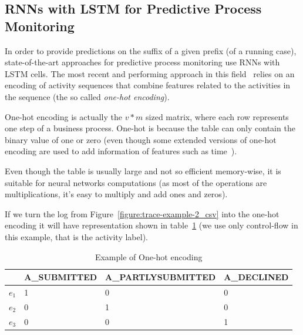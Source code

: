 \subsection{RNNs with LSTM for Predictive Process Monitoring}
\label{subsec:RNNforpredictive}
In order to provide predictions on the suffix of a given prefix (of a running case), state-of-the-art approaches for predictive process monitoring use RNNs with LSTM cells.  The most recent and performing approach in this field~\cite{niek96732} relies on an encoding of activity sequences that combine features related to the activities in the sequence (the so called \textit{one-hot encoding}).

One-hot encoding is actually the $v*m$ sized matrix, where each row represents one step of a business process. One-hot is because the table can only contain the binary value of one or zero (even though some extended versions of one-hot encoding are used to add information of features such as time~\cite{niek96732}). 

Even though the table is usually large and not so efficient memory-wise, it is suitable for neural networks computations (as most of the operations are multiplications, it's easy to multiply and add ones and zeros). 

If we turn the log from Figure~\ref{figure:trace-example-2_csv} into the one-hot encoding it will have representation shown in table~\ref{tab:one-hot} (we use only control-flow in this example, that is the activity label).

\begin{table}[h]
	\centering
	\begin{tabular}{| l | l | l | l |}
		\hline
		& A\_SUBMITTED & A\_PARTLYSUBMITTED & A\_DECLINED \\	
		\hline
		$e_{1}$ & 1 & 0 & 0 \\
		$e_{2}$ & 0 & 1 & 0 \\
		$e_{3}$ & 0 & 0 & 1 \\
		\hline
	\end{tabular}
	\caption{Example of One-hot encoding}
	\label{tab:one-hot}
\end{table}

